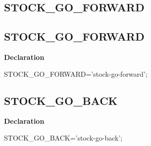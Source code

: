 \documentclass{report}
\newif\ifpdf
\begin{document}
\subsection*{\large{\textbf{STOCK{\_}GO{\_}FORWARD}}\normalsize\hspace{1ex}\hrulefill}
\else
\subsection*{STOCK{\_}GO{\_}FORWARD}
\fi
\label{licommon-STOCK_GO_FORWARD}
\begin{list}{}{
\setlength{\itemindent}{0cm}
\setlength{\listparindent}{0cm}
\setlength{\leftmargin}{\evensidemargin}
\addtolength{\leftmargin}{\tmplength}
\settowidth{\labelsep}{X}
\addtolength{\leftmargin}{\labelsep}
\setlength{\labelwidth}{\tmplength}
}
\item[\textbf{Declaration}\hfill]
\ifpdf
\begin{flushleft}
\fi
\begin{ttfamily}
STOCK{\_}GO{\_}FORWARD='stock-go-forward';\end{ttfamily}

\ifpdf
\end{flushleft}
\fi

\end{list}
\ifpdf
\subsection*{\large{\textbf{STOCK{\_}GO{\_}BACK}}\normalsize\hspace{1ex}\hrulefill}
\else
\subsection*{STOCK{\_}GO{\_}BACK}
\fi
\label{licommon-STOCK_GO_BACK}
\begin{list}{}{
\setlength{\itemindent}{0cm}
\setlength{\listparindent}{0cm}
\setlength{\leftmargin}{\evensidemargin}
\addtolength{\leftmargin}{\tmplength}
\settowidth{\labelsep}{X}
\addtolength{\leftmargin}{\labelsep}
\setlength{\labelwidth}{\tmplength}
}
\item[\textbf{Declaration}\hfill]
\ifpdf
\begin{flushleft}
\fi
\begin{ttfamily}
STOCK{\_}GO{\_}BACK='stock-go-back';\end{ttfamily}

\ifpdf
\end{flushleft}
\fi

\end{list}
\ifpdf
\end{document}
